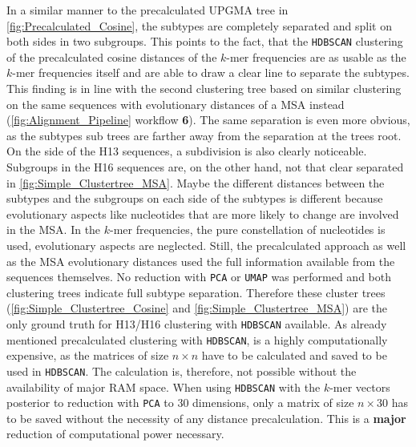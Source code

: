 In a similar manner to the precalculated \gls{UPGMA} tree in \autoref{fig:Precalculated_Cosine}, the subtypes are completely separated and split on both sides in two subgroups. This points to the fact, that the \texttt{HDBSCAN} clustering of the precalculated cosine distances of the $k$-mer frequencies are as usable as the $k$-mer frequencies itself and are able to draw a clear line to separate the subtypes. This finding is in line with the second clustering tree based on similar clustering on the same sequences with evolutionary distances of a \gls{MSA} instead (\autoref{fig:Alignment_Pipeline} workflow \textsf{\textbf{6}}). The same separation is even more obvious, as the subtypes sub trees are farther away from the separation at the trees root. On the side of the H13 sequences, a subdivision is also clearly noticeable. Subgroups in the H16 sequences are, on the other hand, not that clear separated in \autoref{fig:Simple_Clustertree_MSA}. Maybe the different distances between the subtypes and the subgroups on each side of the subtypes is different because evolutionary aspects like nucleotides that are more likely to change are involved in the \gls{MSA}. In the $k$-mer frequencies, the pure constellation of nucleotides is used, evolutionary aspects are neglected. Still, the precalculated approach as well as the \gls{MSA} evolutionary distances used the full information available from the sequences themselves. No reduction with \texttt{PCA} or \texttt{UMAP} was performed and both clustering trees indicate full subtype separation. Therefore these cluster trees (\autoref{fig:Simple_Clustertree_Cosine} and \autoref{fig:Simple_Clustertree_MSA}) are the only ground truth for H13/H16 clustering with \texttt{HDBSCAN} available. As already mentioned precalculated clustering with \texttt{HDBSCAN}, is a highly computationally expensive, as the matrices of size $n \times n$ have to be calculated and saved to be used in \texttt{HDBSCAN}. The calculation is, therefore, not possible without the availability of major RAM space. When using \texttt{HDBSCAN} with the $k$-mer vectors posterior to reduction with \texttt{PCA} to 30 dimensions, only a matrix of size $n\times 30$ has to be saved without the necessity of any distance precalculation. This is a \textbf{major} reduction of computational power necessary. 

\vspace{1em}

